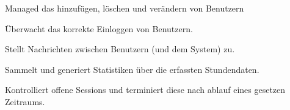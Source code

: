 \begin{itemize}
\begin{itemize}
                        Managed das hinzufügen, löschen und verändern von Benutzern
                        \begin{itemize}
                        \end{itemize}

                        Überwacht das korrekte Einloggen von Benutzern.
                        \begin{itemize}
                        \end{itemize}

                        Stellt Nachrichten zwischen Benutzern (und dem System) zu.
                        \begin{itemize}
                        \end{itemize}

                        Sammelt und generiert Statistiken über die erfassten Stundendaten.
                        \begin{itemize}
                        \end{itemize}

                        Kontrolliert offene Sessions und terminiert diese nach ablauf eines gesetzen Zeitraums.
                        \begin{itemize}
                        \end{itemize}
                \end{itemize}
                \begin{itemize}
                     \itm{}
                \end{itemize}

            \begin{itemize}
                 \itm{}
            \end{itemize}

        \end{itemize}

